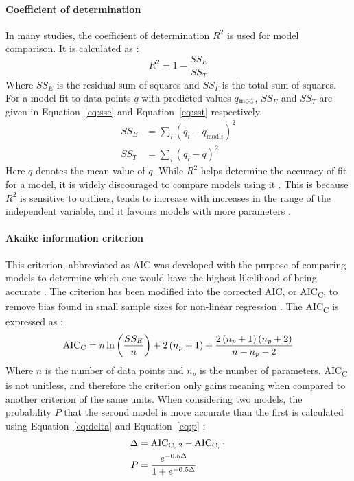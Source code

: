 \paragraph{Coefficient of determination} In many studies, the coefficient of determination $  R^2  $ is used for model comparison. It is calculated as \parencite{El-Khaiary2011}:
\begin{equation}
	R^2 = 1- \frac{SS_E}{SS_T} \label{eq:r2}
\end{equation}
Where $ SS_E $ is the residual sum of squares and $ SS_T $ is the total sum of squares. For a model fit to data points $ q $ with predicted values $ q\textsubscript{mod} $,
 $ SS_E $ and $ SS_T $ are given in Equation~\ref{eq:sse} and Equation~\ref{eq:sst} respectively.  
\begin{align}
	SS_E &= \sum_{i}\left(q_i - q_{\textrm{mod,}i}\right)^2 \label{eq:sse} \\
	SS_T &= \sum_{i} \left(q_i - \bar{q}\right)^2 \label{eq:sst}
\end{align}
Here $ \bar{q} $ denotes the mean value of $ q $. While $ R^2 $ helps determine the accuracy of fit for a model, it is widely discouraged to compare models using it \parencite{El-Khaiary2011,Motulsky2003,Montgomery2013}. This is because $ R^2 $ is sensitive to outliers, tends to increase with increases in the range of the independent variable, and it favours models with more parameters \parencite{El-Khaiary2011}. 

\paragraph{Akaike information criterion} This criterion, abbreviated as AIC was developed with the purpose of comparing models to determine which one would have the highest likelihood of being accurate \parencite{Akaike1974}. The criterion has been modified into the corrected AIC, or AIC\textsubscript{C}, to remove bias found in small sample sizes for non-linear regression \parencite{Hurvich1989}. The AIC\textsubscript{C} is expressed as \parencite{Bolster2007a}: 
\begin{equation}
	\text{AIC}\textsubscript{C} = n \ln \left( \frac{SS_E}{n } \right) +2\left( n_p + 1 \right) + \frac{2\left( n_p + 1 \right)\left( n_p + 2 \right)}{n - n_p - 2} \label{eq:aicc}
\end{equation}
Where $ n $ is the number of data points and $ n_p $ is the number of parameters. AIC\textsubscript{C} is not unitless, and therefore the criterion only gains meaning when compared to another criterion of the same units. When considering two models, the probability $ P $ that the second model is more accurate than the first is calculated using Equation~\ref{eq:delta} and Equation~\ref{eq:p} \parencite{Motulsky2003}:
\begin{align}
	\Delta &= \text{AIC}\textsubscript{C, 2} - \text{AIC}\textsubscript{C, 1} \label{eq:delta} \\
	P &= \frac{e^{-0.5 \Delta}}{1 + e^{-0.5\Delta}} \label{eq:p}
\end{align} 

